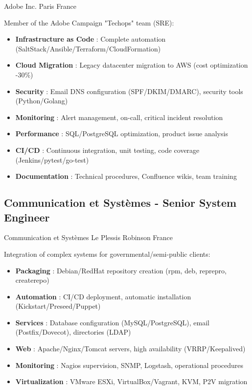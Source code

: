 \documentclass[10pt,a4paper,sans]{moderncv}
\begin{document}
        {Adobe Inc.}
        {Paris}
        {France}
        {Member of the Adobe Campaign "Techops" team (SRE):
        \begin{itemize}
        \item \textbf{Infrastructure as Code} : Complete automation (SaltStack/Ansible/Terraform/CloudFormation)
        \item \textbf{Cloud Migration} : Legacy datacenter migration to AWS (cost optimization -30\%)
        \item \textbf{Security} : Email DNS configuration (SPF/DKIM/DMARC), security tools (Python/Golang)
        \item \textbf{Monitoring} : Alert management, on-call, critical incident resolution
        \item \textbf{Performance} : SQL/PostgreSQL optimization, product issue analysis
        \item \textbf{CI/CD} : Continuous integration, unit testing, code coverage (Jenkins/pytest/go-test)
        \item \textbf{Documentation} : Technical procedures, Confluence wikis, team training
        \end{itemize}
        }

\subsection{Communication et Systèmes - Senior System Engineer}
        {Communication et Systèmes}
        {Le Plessis Robinson}
        {France}
        {Integration of complex systems for governmental/semi-public clients:
        \begin{itemize}
        \item \textbf{Packaging} : Debian/RedHat repository creation (rpm, deb, reprepro, createrepo)
        \item \textbf{Automation} : CI/CD deployment, automatic installation (Kickstart/Preseed/Puppet)
        \item \textbf{Services} : Database configuration (MySQL/PostgreSQL), email (Postfix/Dovecot), directories (LDAP)
        \item \textbf{Web} : Apache/Nginx/Tomcat servers, high availability (VRRP/Keepalived)
        \item \textbf{Monitoring} : Nagios supervision, SNMP, Logstash, operational procedures
        \item \textbf{Virtualization} : VMware ESXi, VirtualBox/Vagrant, KVM, P2V migration
        \end{itemize}
        }
\end{document}
